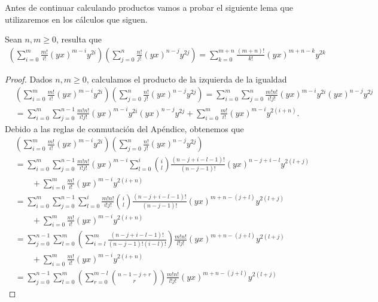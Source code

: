 \documentclass[fleqn,../tesis.tex]{subfiles}
\begin{document}
Antes de continuar calculando productos vamos a probar el siguiente lema que utilizaremos en los cálculos que siguen.
\begin{lema}
	Sean $n, m \geq 0$, resulta que
	\begin{align*}
		\left(\sum_{i = 0}^{m}\frac{m!}{i!}(yx)^{m - i}y^{2i}\right)
			\left(\sum_{j = 0}^{n}\frac{n!}{j!}(yx)^{n - j}y^{2j}\right)
			= \sum_{k = 0}^{m + n}\frac{(m + n)!}{k!}(yx)^{m + n - k}y^{2k}
	\end{align*}
\end{lema}
\begin{proof}
	Dados $n ,m \geq 0$, calculamos el producto de la izquierda de la igualdad
	\begin{align*}
		&\left(\sum_{i = 0}^{m}\frac{m!}{i!}(yx)^{m - i}y^{2i}\right)
			\left(\sum_{j = 0}^{n}\frac{n!}{j!}(yx)^{n - j}y^{2j}\right)
			= \sum_{i = 0}^{m}\sum_{j = 0}^{n}\frac{m!n!}{i!j!}(yx)^{m - i}y^{2i}(yx)^{n - j}y^{2j}\\
		&=\sum_{i = 0}^{m}\sum_{j = 0}^{n - 1}\frac{m!n!}{i!j!}(yx)^{m - i}y^{2i}(yx)^{n - j}y^{2j}
			+\sum_{i = 0}^{m}\frac{m!}{i!}(yx)^{m - i}y^{2(i + n)}.
	\end{align*}
	Debido a las reglas de conmutación del Apéndice, obtenemos que
	\begin{align*}
		&\left(\sum_{i = 0}^{m}\frac{m!}{i!}(yx)^{m - i}y^{2i}\right)
			\left(\sum_{j = 0}^{n}\frac{n!}{j!}(yx)^{n - j}y^{2j}\right)\\
		&=\sum_{i = 0}^{m}\sum_{j = 0}^{n - 1}\frac{m!n!}{i!j!}(yx)^{m - i}
			\sum_{l = 0}^{i}\binom{i}{l}\frac{(n - j + i - l - 1)!}{(n -j - 1)!}(yx)^{n - j + i - l}y^{2(l + j)}\\
		&\qquad + \sum_{i = 0}^{m}\frac{m!}{i!}(yx)^{m - i}y^{2(i + n)}\\
		&=\sum_{i = 0}^{m}\sum_{j = 0}^{n - 1}\sum_{l = 0}^{i}\frac{m!n!}{i!j!}
			\binom{i}{l}\frac{(n - j + i - l - 1)!}{(n -j - 1)!}(yx)^{m + n - (j + l)}y^{2(l + j)}\\
		&\qquad + \sum_{i = 0}^{m}\frac{m!}{i!}(yx)^{m - i}y^{2(i + n)}\\
		&=\sum_{j = 0}^{n - 1}\sum_{l = 0}^{m}
			\left(\sum_{i = l}^{m}\frac{(n - j + i - l - 1)!}{(n -j - 1)!(i - l)!}\right)\frac{m!n!}{l!j!}
			(yx)^{m + n - (j + l)}y^{2(l + j)}\\
		&\qquad + \sum_{i = 0}^{m}\frac{m!}{i!}(yx)^{m - i}y^{2(i + n)}\\
		&=\sum_{j = 0}^{n - 1}\sum_{l = 0}^{m}
			\left(\sum_{r = 0}^{m - l}\binom{n - 1 - j + r}{r}\right)\frac{m!n!}{l!j!}
			(yx)^{m + n - (j + l)}y^{2(l + j)}

\end{align*}
\end{proof}
\end{document}
